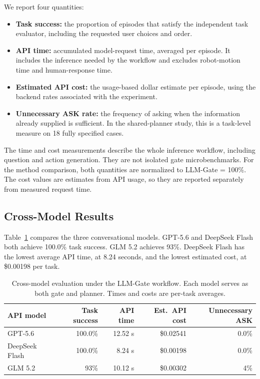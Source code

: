 \documentclass{article}
\begin{document}
We report four quantities:
\begin{itemize}
  \item \textbf{Task success:} the proportion of episodes that satisfy the
  independent task evaluator, including the requested user choices and order.
  \item \textbf{API time:} accumulated model-request time, averaged per episode.
  It includes the inference needed by the workflow and excludes robot-motion
  time and human-response time.
  \item \textbf{Estimated API cost:} the usage-based dollar estimate per
  episode, using the backend rates associated with the experiment.
  \item \textbf{Unnecessary ASK rate:} the frequency of asking when the
  information already supplied is sufficient. In the shared-planner study,
  this is a task-level measure on 18 fully specified cases.
\end{itemize}

The time and cost measurements describe the whole inference workflow, including
question and action generation. They are not isolated gate microbenchmarks.
For the method comparison, both quantities are normalized to LLM-Gate = 100\%.
The cost values are estimates from API usage, so they are reported separately
from measured request time.

\subsection{Cross-Model Results}

Table~\ref{tab:models} compares the three conversational models.
GPT-5.6 and DeepSeek Flash both achieve 100.0\% task success. GLM 5.2 achieves
93\%. DeepSeek Flash has the lowest average API time, at 8.24 seconds, and the
lowest estimated cost, at \$0.00198 per task.

\begin{table}[t]
\caption{Cross-model evaluation under the LLM-Gate workflow. Each model serves
as both gate and planner. Times and costs are per-task averages.}
\label{tab:models}
\centering
\small
\begin{tabular*}{\linewidth}{@{\extracolsep{\fill}}lrrrr@{}}
\toprule
API model & Task success & API time & Est.\ API cost & Unnecessary ASK \\
\midrule
GPT-5.6 & 100.0\% & 12.52 s & \$0.02541 & 0.0\% \\
DeepSeek Flash & 100.0\% & 8.24 s & \$0.00198 & 0.0\% \\
GLM 5.2 & 93\% & 10.12 s & \$0.00302 & 4\% \\
\bottomrule
\end{tabular*}
\end{table}
\end{document}
